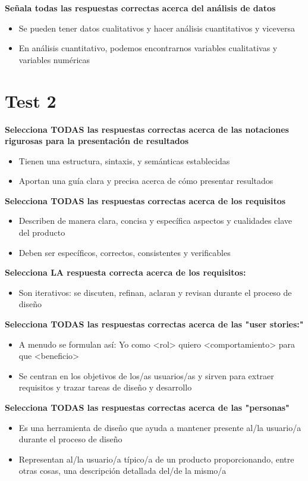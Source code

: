\documentclass[12pt]{report} %
\begin{document}
\textbf{Señala todas las respuestas correctas acerca del análisis de datos}
\begin{itemize}
  \item Se pueden tener datos cualitativos y hacer análisis cuantitativos y viceversa
  \item En análisis cuantitativo, podemos encontrarnos variables cualitativas y variables numéricas
\end{itemize}
\pagebreak
\section{Test 2}

\textbf{Selecciona TODAS las respuestas correctas acerca de las notaciones rigurosas para la presentación de resultados}
\begin{itemize}
  \item Tienen una estructura, sintaxis, y semánticas establecidas
  \item Aportan una guía clara y precisa acerca de cómo presentar resultados
\end{itemize}

\textbf{Selecciona TODAS las respuestas correctas acerca de los requisitos}
\begin{itemize}
  \item Describen de manera clara, concisa y específica aspectos y cualidades clave del producto
  \item Deben ser específicos, correctos, consistentes y verificables
\end{itemize}

\textbf{Selecciona LA respuesta correcta acerca de los requisitos:}
\begin{itemize}
  \item Son iterativos: se discuten, refinan, aclaran y revisan durante el proceso de diseño
\end{itemize}

\textbf{Selecciona TODAS las respuestas correctas acerca de las "user stories:"}
\begin{itemize}
  \item A menudo se formulan así: Yo como <rol> quiero <comportamiento> para que <beneficio>
  \item Se centran en los objetivos de los/as usuarios/as y sirven para extraer requisitos y trazar tareas de diseño y desarrollo
\end{itemize}

\textbf{Selecciona TODAS las respuestas correctas acerca de las "personas"}
\begin{itemize}
  \item Es una herramienta de diseño que ayuda a mantener presente al/la usuario/a durante el proceso de diseño
  \item Representan al/la usuario/a típico/a de un producto proporcionando, entre otras cosas,  una descripción detallada del/de la mismo/a
\end{itemize}
\end{document}

